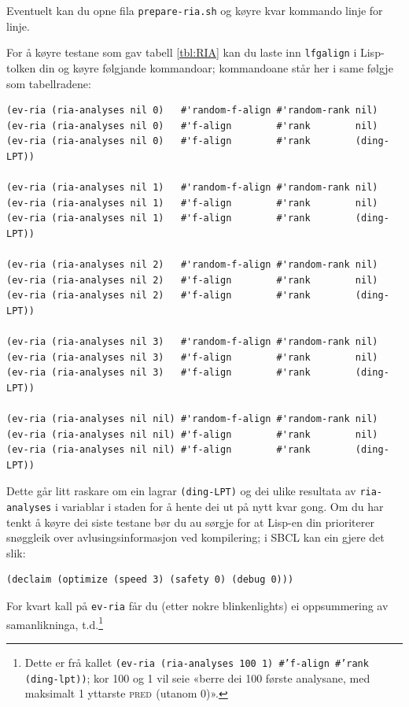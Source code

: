 \documentclass[12pt,a4paper,oneside,draft]{report}
\newcommand{\F}[2]{\textsc{#1}\ensuremath{_{#2}}}
\newcommand{\PRED}{\F{pred}{}}
\begin{document}
Eventuelt kan du opne fila \texttt{prepare-ria.sh} og køyre kvar kommando
 linje for linje.

For å køyre testane som gav tabell \ref{tbl:RIA} kan du laste inn
 \texttt{lfgalign} i Lisp-tolken din og køyre følgjande kommandoar;
 kommandoane står her i same følgje som tabellradene:


\begin{verbatim}
(ev-ria (ria-analyses nil 0)   #'random-f-align #'random-rank nil)
(ev-ria (ria-analyses nil 0)   #'f-align        #'rank        nil)
(ev-ria (ria-analyses nil 0)   #'f-align        #'rank        (ding-LPT))

(ev-ria (ria-analyses nil 1)   #'random-f-align #'random-rank nil)
(ev-ria (ria-analyses nil 1)   #'f-align        #'rank        nil)
(ev-ria (ria-analyses nil 1)   #'f-align        #'rank        (ding-LPT))

(ev-ria (ria-analyses nil 2)   #'random-f-align #'random-rank nil)
(ev-ria (ria-analyses nil 2)   #'f-align        #'rank        nil)
(ev-ria (ria-analyses nil 2)   #'f-align        #'rank        (ding-LPT))

(ev-ria (ria-analyses nil 3)   #'random-f-align #'random-rank nil)
(ev-ria (ria-analyses nil 3)   #'f-align        #'rank        nil)
(ev-ria (ria-analyses nil 3)   #'f-align        #'rank        (ding-LPT))

(ev-ria (ria-analyses nil nil) #'random-f-align #'random-rank nil)
(ev-ria (ria-analyses nil nil) #'f-align        #'rank        nil)
(ev-ria (ria-analyses nil nil) #'f-align        #'rank        (ding-LPT))
\end{verbatim}



Dette går litt raskare om ein lagrar \texttt{(ding-LPT)} og dei ulike
 resultata av \texttt{ria-analyses} i variablar i staden for å hente dei ut
 på nytt kvar gong. Om du har tenkt å køyre dei siste testane bør du
 au sørgje for at Lisp-en din prioriterer snøggleik over
 avlusingsinformasjon ved kompilering; i SBCL kan ein gjere det slik:


\begin{verbatim}
(declaim (optimize (speed 3) (safety 0) (debug 0)))
\end{verbatim}



For kvart kall på \texttt{ev-ria} får du (etter nokre blinkenlights) ei
 oppsummering av samanlikninga, t.d.\footnote{Dette er frå kallet \texttt{(ev-ria (ria-analyses         100 1) \#'f-align \#'rank (ding-lpt))}; kor 100 og 1 vil seie
        «berre dei 100 første analysane, med maksimalt 1 yttarste
        \PRED{} (utanom 0)». }
\end{document}
